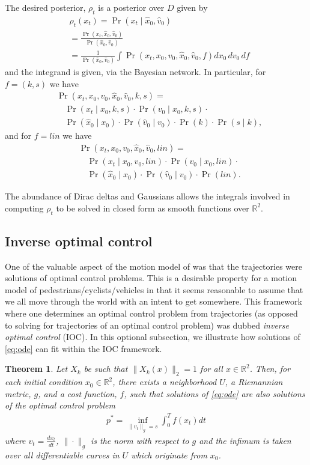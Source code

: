 \documentclass[conference]{IEEEtran}
\newtheorem{thm}{Theorem}
\begin{document}
The desired posterior, $\rho_t$ is a posterior over $D$ given by
\begin{align*}
	&\rho_t(x_t) = \Pr(x_t \mid \hat{x}_0, \hat{v}_0) \\
		&= \frac{ \Pr( x_t, \hat{x}_0, \hat{v}_0) }{ \Pr( \hat{x}_0, \hat{v}_0 ) } \\
		&= \frac{1}{ \Pr( \hat{x}_0, \hat{v}_0 ) } \int \Pr( x_t , x_0, v_0, \hat{x}_0, \hat{v}_0 , f ) dx_0\, dv_0\, df
\end{align*}
and the integrand is given, via the Bayesian network.
In particular, for $f = (k,s)$ we have
\begin{align*}
	 &\Pr( x_t , x_0, v_0, \hat{x}_0, \hat{v}_0 , k,s) =\\
	 &\quad \Pr( x_t \mid x_0 , k, s) \cdot \Pr( v_0 \mid x_0, k , s ) \cdot \\
	 &\quad \Pr( \hat{x}_0 \mid x_0 ) \cdot \Pr( \hat{v}_0 \mid v_0 ) \cdot \Pr(k) \cdot \Pr(s \mid k),
\end{align*}
and for $f = lin$ we have
\begin{align*}
	 &\Pr( x_t , x_0, v_0, \hat{x}_0, \hat{v}_0 , lin) =\\
	 &\quad \Pr( x_t \mid x_0 , v_0, lin) \cdot \Pr( v_0 \mid x_0, lin ) \cdot \\
	 &\quad \Pr( \hat{x}_0 \mid x_0 ) \cdot \Pr( \hat{v}_0 \mid v_0 ) \cdot \Pr(lin).
\end{align*}

The abundance of Dirac deltas and Gaussians allows the integrals involved in computing $\rho_t$ to be solved in closed form
as smooth functions over $\mathbb{R}^2$.

\subsection{Inverse optimal control}
One of the valuable aspect of the motion model of \cite{Kitani2012} was that the trajectories were solutions of optimal control problems.
This is a desirable property for a motion model of pedestrians/cyclists/vehicles in that it seems reasonable to assume that we all move through the world with an intent to get somewhere.
This framework where one determines an optimal control problem from trajectories (as opposed to solving for trajectories of an optimal control problem) was dubbed \emph{inverse optimal control} (IOC).
In this optional subsection, we illustrate how solutions of \ref{eq:ode} can fit within the IOC framework.

\begin{thm}
	Let $X_k$ be such that $\| X_k(x) \|_2 = 1$ for all $x \in \mathbb{R}^2$.
Then, for each initial condition $x_0 \in \mathbb{R}^2$, there exists a neighborhood $U$, a Riemannian metric, $g$, and a cost function, $f$, 
such that solutions of \eqref{eq:ode} are also solutions of the optimal control problem
\begin{align*}
	p^* = \inf_{ \| v_t \|_g = s } \int_0^T f( x_t) dt
\end{align*}
where $v_t = \frac{d x_t}{dt}$, $\| \cdot \|_g$ is the norm with respect to $g$ and the infimum is taken over all differentiable curves in $U$ which originate from $x_0$.
\end{thm}
\end{document}
